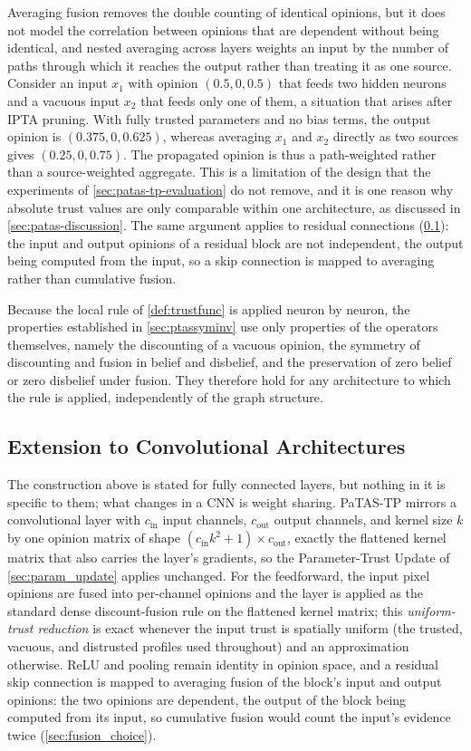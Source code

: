 Averaging fusion removes the double counting of identical opinions, but it does not model the correlation between opinions that are dependent without being identical, and nested averaging across layers weights an input by the number of paths through which it reaches the output rather than treating it as one source. Consider an input $x_1$ with opinion $(0.5, 0, 0.5)$ that feeds two hidden neurons and a vacuous input $x_2$ that feeds only one of them, a situation that arises after \ac{IPTA} pruning. With fully trusted parameters and no bias terms, the output opinion is $(0.375, 0, 0.625)$, whereas averaging $x_1$ and $x_2$ directly as two sources gives $(0.25, 0, 0.75)$. The propagated opinion is thus a path-weighted rather than a source-weighted aggregate. This is a limitation of the design that the experiments of \cref{sec:patas-tp-evaluation} do not remove, and it is one reason why absolute trust values are only comparable within one architecture, as discussed in \cref{sec:patas-discussion}. The same argument applies to residual connections (\cref{sec:conv_trust}): the input and output opinions of a residual block are not independent, the output being computed from the input, so a skip connection is mapped to averaging rather than cumulative fusion.

Because the local rule of \cref{def:trustfunc} is applied neuron by neuron, the properties established in \cref{sec:ptassyminv} use only properties of the operators themselves, namely the discounting of a vacuous opinion, the symmetry of discounting and fusion in belief and disbelief, and the preservation of zero belief or zero disbelief under fusion. They therefore hold for any architecture to which the rule is applied, independently of the graph structure.

\subsection{Extension to Convolutional Architectures}
\label{sec:conv_trust}
The construction above is stated for fully connected layers, but nothing in it is specific to them; what changes in a \ac{CNN} is weight sharing. \ac{PaTAS-TP} mirrors a convolutional layer with $c_{\mathrm{in}}$ input channels, $c_{\mathrm{out}}$ output channels, and kernel size $k$ by one opinion matrix of shape $(c_{\mathrm{in}} k^2 + 1) \times c_{\mathrm{out}}$, exactly the flattened kernel matrix that also carries the layer's gradients, so the Parameter-Trust Update of \cref{sec:param_update} applies unchanged. For the feedforward, the input pixel opinions are fused into per-channel opinions and the layer is applied as the standard dense discount-fusion rule on the flattened kernel matrix; this \emph{uniform-trust reduction} is exact whenever the input trust is spatially uniform (the trusted, vacuous, and distrusted profiles used throughout) and an approximation otherwise. ReLU and pooling remain identity in opinion space, and a residual skip connection is mapped to averaging fusion of the block's input and output opinions: the two opinions are dependent, the output of the block being computed from its input, so cumulative fusion would count the input's evidence twice (\cref{sec:fusion_choice}).

